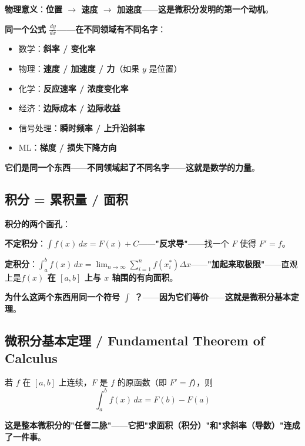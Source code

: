 \textbf{物理意义}：\textbf{位置 $\to$ 速度 $\to$ 加速度}——\textbf{这是微积分发明的第一个动机}。

\begin{example}[导数的多重身份]
\textbf{同一个公式 $\frac{dy}{dx}$——在不同领域有不同名字}：
\begin{itemize}
\item 数学：\textbf{斜率 / 变化率}
\item 物理：\textbf{速度 / 加速度 / 力}（如果 $y$ 是位置）
\item 化学：\textbf{反应速率 / 浓度变化率}
\item 经济：\textbf{边际成本 / 边际收益}
\item 信号处理：\textbf{瞬时频率 / 上升沿斜率}
\item ML：\textbf{梯度 / 损失下降方向}
\end{itemize}
\textbf{它们是同一个东西}——\textbf{不同领域起了不同名字}——\textbf{这就是数学的力量}。
\end{example}

\subsection{积分 = 累积量 / 面积}

\textbf{积分的两个面孔}：

\textbf{不定积分}：$\int f(x) \, dx = F(x) + C$——\textbf{"反求导"}——找一个 $F$ 使得 $F'=f$。

\textbf{定积分}：$\int_a^b f(x) \, dx = \lim_{n\to\infty} \sum_{i=1}^n f(x_i^*) \Delta x$——\textbf{"加起来取极限"}——直观上是\textbf{$f(x)$ 在 $[a,b]$ 上与 $x$ 轴围的有向面积}。

\textbf{为什么这两个东西用同一个符号 $\int$ ？}——\textbf{因为它们等价}——\textbf{这就是微积分基本定理}。

\subsection{微积分基本定理 / Fundamental Theorem of Calculus}

\begin{theorem}[微积分基本定理]
若 $f$ 在 $[a,b]$ 上连续，$F$ 是 $f$ 的原函数（即 $F'=f$），则
\begin{equation}
\int_a^b f(x) \, dx = F(b) - F(a)
\end{equation}
\end{theorem}

\textbf{这是整本微积分的"任督二脉"}——\textbf{它把"求面积（积分）"和"求斜率（导数）"连成了一件事}。

